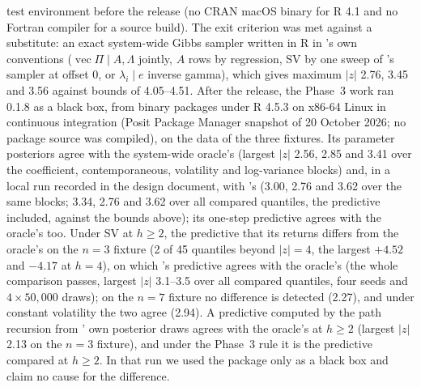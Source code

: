 \begin{itemize}
test environment before the release (no CRAN macOS binary for R 4.1 and no Fortran compiler for a
source build). The exit criterion was met
against a substitute: an exact system-wide Gibbs sampler written in R in 's own
conventions ($\operatorname{vec}\Pi \mid A, \Lambda$ jointly, $A$ rows by regression, SV by one sweep
of 's sampler at offset 0, or $\lambda_i \mid e$ inverse gamma), which gives maximum
$|z|$ 2.76, 3.45 and 3.56 against bounds of 4.05--4.51.
After the release, the Phase~3 work ran  0.1.8 as a black box, from binary
packages under R 4.5.3 on x86-64 Linux in continuous integration (Posit Package Manager snapshot of
20 October 2026; no package source was compiled), on the data of the three fixtures. Its parameter
posteriors agree with the system-wide oracle's (largest $|z|$ 2.56, 2.85 and 3.41 over the
coefficient, contemporaneous, volatility and log-variance blocks) and, in a local run recorded in
the design document, with 's (3.00, 2.76 and 3.62 over the same blocks; 3.34, 2.76 and 3.62 over all
compared quantiles, the predictive included, against the bounds above); its one-step predictive agrees with the oracle's too. Under SV at $h \geq 2$, the
predictive that its  returns differs from the oracle's on the $n = 3$ fixture (2 of
45 quantiles beyond $|z| = 4$, the largest $+4.52$ and $-4.17$ at $h = 4$), on which 's
predictive agrees with the oracle's (the whole comparison passes, largest $|z|$ 3.1--3.5 over all
compared quantiles, four seeds and $4 \times 50{,}000$ draws); on the $n = 7$ fixture
no difference is detected (2.27), and under constant volatility the two agree (2.94). A predictive
computed by the path recursion from ' own posterior draws agrees with the oracle's
at $h \geq 2$ (largest $|z|$ 2.13 on the $n = 3$ fixture), and under the Phase~3 rule it is the
predictive compared at $h \geq 2$. In that run we used the package only as a black box and claim no cause for the
difference.

\end{itemize}
